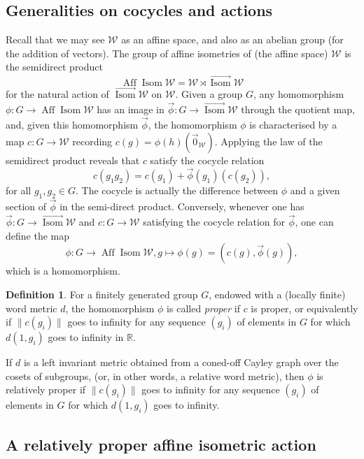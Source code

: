 \documentclass[11pt]{article}
\theoremstyle{definition}
\newtheorem{defi}[theo]{Definition}
\numberwithin{equation}{section}
\DeclareMathOperator{\Isom}{Isom}
\DeclareMathOperator{\Aff}{Aff}
\begin{document}
\subsection{Generalities on cocycles and actions} Recall that we may see $ {\mathscr{W}} $ as an affine space, and also as an abelian group (for the addition of vectors). The group of affine isometries of (the affine space) ${\mathscr{W}} $ is the semidirect
product
\[
{\Aff \Isom} {\mathscr{W}} = {\mathscr{W}} \rtimes \overrightarrow{{\Isom}} {\mathscr{W}}
\]
for
the natural action of $\overrightarrow{{\Isom}} {\mathscr{W}} $ on ${\mathscr{W}} $. Given a group $G$, any homomorphism $\phi:G\to {\Aff \Isom}{\mathscr{W}}$ has an image in $\vec{\phi}:G\to \overrightarrow{{\Isom}} {\mathscr{W}} $ through the quotient map, and, given this homomorphism $\vec{\phi}$, the homomorphism $\phi$ is characterised by a map $c:G\to {\mathscr{W}} $ recording $c(g) =
\phi(h)(\vec{0}_ {\mathscr{W}})$. Applying the law of the semidirect product reveals that $c$ satisfy the cocycle relation
\[
c(g_1g_2) = c(g_1) + \vec{\phi}(g_1) (c(g_2)),
\]
for all $g_1,g_2\in G$. The cocycle is actually the difference between $\phi$ and a given section of $\vec{\phi}$ in the semi-direct product. Conversely, whenever one has $\vec{\phi}:G\to \overrightarrow{{\Isom}} {\mathscr{W}}$ and $c:G\to {\mathscr{W}}$ satisfying the cocycle relation for $\vec{\phi}$, one can define the map
\[
\phi:G\to {\Aff \Isom} {\mathscr{W}}, g\mapsto \phi(g) = (c(g), \vec{\phi}(g)),
\]
which is a homomorphism.


\begin{defi}\label{proper}
For a finitely generated group $G$, endowed
with a (locally finite) word metric $d$, the homomorphism $\phi$ is called \emph{proper} if $c$ is proper, or equivalently if $\|c(g_i)\|$ goes to infinity for any sequence $(g_i)$ of elements in $G$ for which $d(1,g_i)$ goes to infinity in $\mathbb{R}$.

If $d$ is a left invariant metric obtained from a coned-off Cayley graph over the cosets of subgroups, (or, in other words, a relative word metric), then $\phi$ is relatively proper if $\|c(g_i)\|$ goes to infinity for any sequence $(g_i)$ of elements in $G$ for which $d(1,g_i)$ goes to infinity.
\end{defi}

\subsection{A relatively proper affine isometric action}
\end{document}
